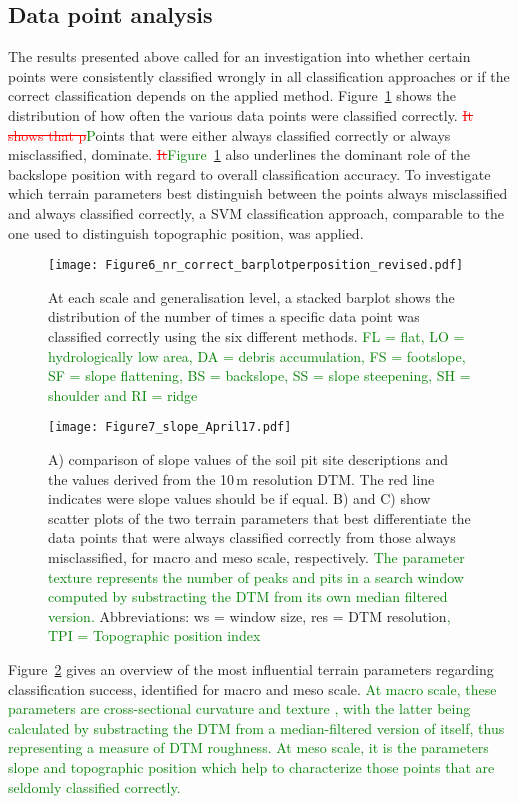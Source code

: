 \documentclass[preprint,12pt,authoryear]{elsarticle}
\begin{document}
\subsection{Data point analysis} 
The results presented above called for an investigation into whether certain points were consistently classified wrongly in all classification approaches or if the correct classification depends on the applied method. Figure~\ref{fig:hist_correct_per_tp} shows the distribution of how often the various data points were classified correctly. \textcolor{red}{\sout{It shows that p}}\textcolor{green}{P}oints that were either always classified correctly or always misclassified, dominate. \textcolor{red}{\sout{It}}\textcolor{green}{Figure~\ref{fig:hist_correct_per_tp}} also underlines the dominant role of the backslope position with regard to overall classification accuracy. To investigate which terrain parameters best distinguish between the points always misclassified and always classified correctly, a SVM classification approach, comparable to the one used to distinguish topographic position, was applied.
\begin{figure}
\texttt{[image: Figure6\_nr\_correct\_barplotperposition\_revised.pdf]}
\caption{At each scale and generalisation level, a stacked barplot shows the distribution of the number of times a specific data point was classified correctly using the six different methods. \textcolor{green}{FL = flat, LO = hydrologically low area, DA = debris accumulation, FS = footslope, SF = slope flattening, BS = backslope, SS = slope steepening, SH = shoulder and RI = ridge}}
\label{fig:hist_correct_per_tp}
\end{figure}
\begin{figure}
\texttt{[image: Figure7\_slope\_April17.pdf]}
\caption{A) comparison of slope values of the soil pit site descriptions and the  values derived from the 10\,m resolution DTM. The red line indicates were slope values should be if equal. B) and C) show scatter plots of the two terrain parameters that best differentiate the data points that were always classified correctly from those always misclassified, for macro and meso scale, respectively. \textcolor{green} {The parameter texture represents the number of peaks and pits in a search window computed by substracting the DTM from its own median filtered version.} Abbreviations: ws = window size, res = DTM resolution\textcolor{green}{, TPI = Topographic position index}}
\label{fig:slope}
\end{figure}
 Figure~\ref{fig:slope} gives an overview of the most influential terrain parameters regarding classification success, identified for macro and meso scale. \textcolor{green}{At macro scale, these parameters are cross-sectional curvature and texture \citep{Iwahashi2007}, with the latter being calculated by substracting the DTM from a median-filtered version of itself, thus representing a measure of DTM roughness. At meso scale, it is the parameters slope and topographic position which help to characterize those points that are seldomly classified correctly.} 
\end{document}
